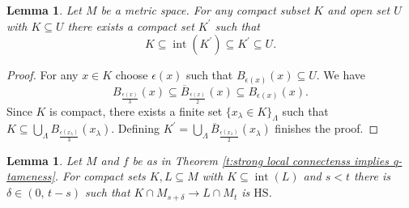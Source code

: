 \documentclass{amsart}
\newtheorem{lemma}[theorem]{Lemma}
\theoremstyle{definition}
\newcommand{\HS}{\mathrm{HS}}
\DeclareMathOperator{\interior}{int}
\begin{document}
\begin{lemma} \label{l:neighborhood third}
	Let $M$ be a metric space. For any compact subset $K$ and open set $U$ with $K \subseteq U$ there exists a compact set $K^\prime$ such that
	\begin{equation*}
	K \subseteq \interior(K^\prime) \subseteq K^\prime \subseteq U.
	\end{equation*}
\end{lemma}

\begin{proof}
	For any $x \in K$ choose $\epsilon(x)$ such that $B_{\epsilon(x)}(x) \subseteq U$. We have
	\begin{equation*}
	B_{\frac{\epsilon(x)}{3}}(x) \subseteq \overline B_{\frac{\epsilon(x)}{2}}(x) \subseteq B_{\epsilon(x)}(x).
	\end{equation*}
	Since $K$ is compact, there exists a finite set $\{x_\lambda \in K\}_{\Lambda}$ such that $K \subseteq \bigcup_{\Lambda} B_{\frac{\epsilon(x_\lambda)}{3}}(x_\lambda)$. Defining $K^\prime = \bigcup_{\Lambda} \overline B_{\frac{\epsilon(x_\lambda)}{2}}(x_\lambda)$ finishes the proof.
\end{proof}

\begin{lemma} \label{l:key lemma for q-tameness}
	Let $M$ and $f$ be as in Theorem \ref{t:strong local connectenss implies q-tameness}.
	For compact sets $K, L \subseteq M$ with $K \subseteq \interior(L)$ and $s < t$ there is $\delta \in (0,\, t-s)$ such that $K \cap M_{s+\delta} \to L \cap M_{t}$ is $\HS$.
\end{lemma}
\end{document}
